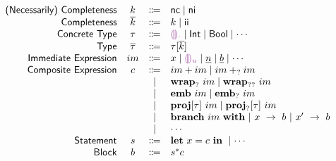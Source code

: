



\begin{center}
  \[\begin{array}{rccl}
    \SortNComplete & \SortNCompleteVar & \Coloneqq & \CNC \mid \CNI                                                                              \\
    \SortComplete  & \SortCompleteVar  & \Coloneqq & \SortNCompleteVar \mid \CII                                                                 \\
    \SortTypCon    & \SortTypConVar    & \Coloneqq & \TCHole \mid \TCInt \mid \TCBool \mid \cdots                                                   \\
    \SortTyp       & \SortTypVar       & \Coloneqq & \SortTypConVar[\SortCompleteVar]                                                            \\
    \SortImm       & \SortImmVar       & \Coloneqq & x \mid \EEHole{\SortHoleId}
                                                   \mid \underline{n} \mid \underline{b} \mid \cdots                                              \\
    \SortComp      & \SortCompVar      & \Coloneqq & \EPlusPrim{\SortImmVar}{\SortImmVar} 
                                                   \mid \EPlusIndet{\SortImmVar}{\SortImmVar} \\
                   &                   & \mid         & \EWrapIndet{\SortImmVar}
                                                   \mid \EWrapMaybe{\SortImmVar} \\
                   &                   & \mid         & \EEmbedPrim{\SortImmVar}
                                                   \mid \EEmbedIndet{\SortImmVar} \\
                   &                   & \mid         & \EProjPrim{\SortImmVar}{\SortTypConVar}
                                                   \mid \EProjIndet{\SortImmVar}{\SortTypConVar} \\
                   &                   & \mid         & \EBranchWith{\SortImmVar}
                                                     \EBranchBr{x}{\SortBlockVar}
                                                    ~\EBranchBr{x'}{\SortBlockVar} \\
                   &                   & \mid         & \cdots \\
    \SortStmt      & \SortStmtVar      & \Coloneqq & \ELet{x}{\SortCompVar} \EInn \mid \cdots                                                    \\
    \SortBlock      & \SortBlockVar      & \Coloneqq & \SortStmtVar^{*} \SortCompVar
  \end{array}\]
\end{center}
